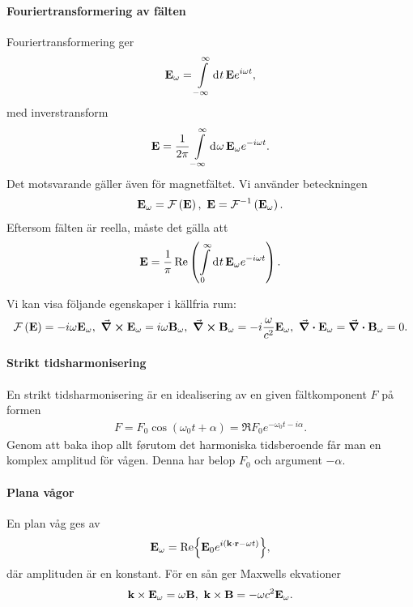 \paragraph{Fouriertransformering av fälten}
Fouriertransformering ger
\begin{align*}
	\vb{E}_{\omega} = \int\limits_{-\infty}^{\infty}\dd[]{t}\vb{E}e^{i\omega t},
\end{align*}
med inverstransform
\begin{align*}
	\vb{E} = \frac{1}{2\pi}\int\limits_{-\infty}^{\infty}\dd[]{\omega}\vb{E}_{\omega}e^{-i\omega t}.
\end{align*}
Det motsvarande gäller även för magnetfältet. Vi använder beteckningen
\begin{align*}
	\vb{E}_{\omega} = \mathcal{F}\left(\vb{E}\right),\ \vb{E} = \mathcal{F}^{-1}\left(\vb{E}_{\omega}\right).
\end{align*}
Eftersom fälten är reella, måste det gälla att
\begin{align*}
	\vb{E} = \frac{1}{\pi}\Re\left(\int\limits_{0}^{\infty}\dd[]{t}\vb{E}_{\omega}e^{-i\omega t}\right).
\end{align*}

Vi kan visa följande egenskaper i källfria rum:
\begin{align*}
	\mathcal{F}\left(\vb{E}\right) = -i\omega\vb{E}_{\omega},\ \curl{\vb{E}_{\omega}} = i\omega\vb{B}_{\omega},\ \curl{\vb{B}_{\omega}} = -i\frac{\omega}{c^{2}}\vb{E}_{\omega},\ \div{\vb{E}_{\omega}} = \div{\vb{B}_{\omega}} = 0.
\end{align*}

\paragraph{Strikt tidsharmonisering}
En strikt tidsharmonisering är en idealisering av en given fältkomponent $F$ på formen
\begin{align*}
	F = F_{0}\cos(\omega_{0}t + \alpha) = \Re{F_{0}e^{-\omega_{0}t - i\alpha}}.
\end{align*}
Genom att baka ihop allt førutom det harmoniska tidsberoende får man en komplex amplitud för vågen. Denna har belop $F_{0}$ och argument $-\alpha$.

\paragraph{Plana vågor}
En plan våg ges av
\begin{align*}
	\vb{E}_{\omega} = \Re{\vb{E}_{0}e^{i(\vb{k}\cdot\vb{r} - \omega t)}},
\end{align*}
där amplituden är en konstant. För en sån ger Maxwells ekvationer
\begin{align*}
	\vb{k}\times\vb{E}_{\omega} = \omega\vb{B},\ \vb{k}\times\vb{B} = -\omega c^{2}\vb{E}_{\omega}.
\end{align*}

